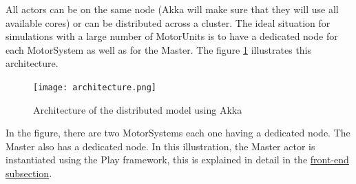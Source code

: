 \documentclass[titlepage]{article}
\begin{document}
All actors can be on the same node (Akka will make sure that they will use all available cores) or can be distributed across a cluster. The ideal situation for simulations with a large number of MotorUnits is to have a dedicated node for each MotorSystem as well as for the Master. The figure \ref{fig:architecture} illustrates this architecture.
\begin{figure}[H]
  \hspace*{-2cm}
  \texttt{[image: architecture.png]}
  \caption{Architecture of the distributed model using Akka}
  \label{fig:architecture}
\end{figure}
In the figure, there are two MotorSystems each one having a dedicated node. The Master also has a dedicated node. In this illustration, the Master actor is instantiated using the Play framework, this is explained in detail in the \hyperref[sec:front]{front-end subsection}. 
\end{document}
